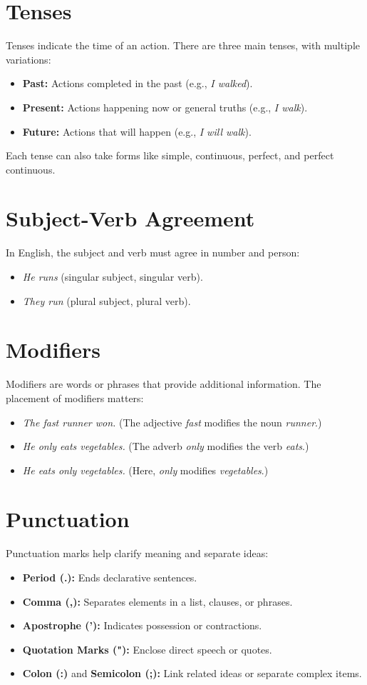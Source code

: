 \documentclass{book}
\begin{document}
\section{Tenses}
Tenses indicate the time of an action. There are three main tenses, with multiple variations:

\begin{itemize}
	\item \textbf{Past:} Actions completed in the past (e.g., \textit{I walked}).
	\item \textbf{Present:} Actions happening now or general truths (e.g., \textit{I walk}).
	\item \textbf{Future:} Actions that will happen (e.g., \textit{I will walk}).
\end{itemize}

Each tense can also take forms like simple, continuous, perfect, and perfect continuous.

\section{Subject-Verb Agreement}
In English, the subject and verb must agree in number and person:
\begin{itemize}
	\item \textit{He runs} (singular subject, singular verb).
	\item \textit{They run} (plural subject, plural verb).
\end{itemize}

\section{Modifiers}
Modifiers are words or phrases that provide additional information. The placement of modifiers matters:
\begin{itemize}
	\item \textit{The fast runner won.} (The adjective \textit{fast} modifies the noun \textit{runner}.)
	\item \textit{He only eats vegetables.} (The adverb \textit{only} modifies the verb \textit{eats}.)
	\item \textit{He eats only vegetables.} (Here, \textit{only} modifies \textit{vegetables}.)
\end{itemize}

\section{Punctuation}
Punctuation marks help clarify meaning and separate ideas:
\begin{itemize}
	\item \textbf{Period (.):} Ends declarative sentences.
	\item \textbf{Comma (,):} Separates elements in a list, clauses, or phrases.
	\item \textbf{Apostrophe ('):} Indicates possession or contractions.
	\item \textbf{Quotation Marks ("):} Enclose direct speech or quotes.
	\item \textbf{Colon (:)} and \textbf{Semicolon (;):} Link related ideas or separate complex items.
\end{itemize}
\end{document}
